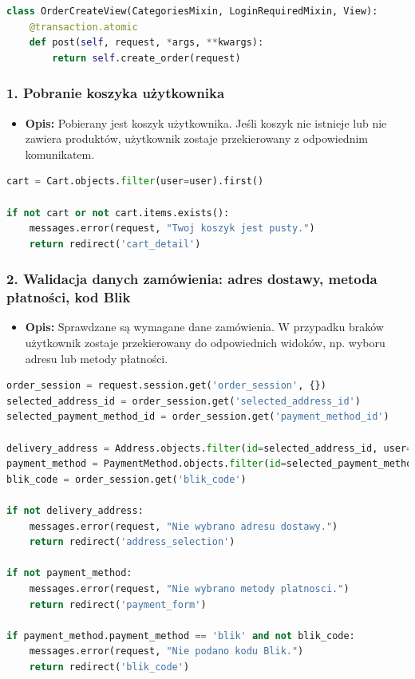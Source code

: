 \documentclass[12pt,a4paper,oneside]{article}
\theoremstyle{definition}
\numberwithin{equation}{section}
\begin{document}
\begin{lstlisting}[language=Python, caption=Metoda post()]
class OrderCreateView(CategoriesMixin, LoginRequiredMixin, View):
    @transaction.atomic
    def post(self, request, *args, **kwargs):
        return self.create_order(request)
\end{lstlisting}



\subsubsection*{1. Pobranie koszyka użytkownika}
\begin{itemize}
    \item \textbf{Opis:} Pobierany jest koszyk użytkownika. Jeśli koszyk nie istnieje lub nie zawiera produktów, użytkownik zostaje przekierowany z odpowiednim komunikatem.
\end{itemize}

\begin{lstlisting}[language=Python]
cart = Cart.objects.filter(user=user).first()

if not cart or not cart.items.exists():
    messages.error(request, "Twoj koszyk jest pusty.")
    return redirect('cart_detail')
\end{lstlisting}



\subsubsection*{2. Walidacja danych zamówienia: adres dostawy, metoda płatności, kod Blik}
\begin{itemize}
    \item \textbf{Opis:} Sprawdzane są wymagane dane zamówienia. W przypadku braków użytkownik zostaje przekierowany do odpowiednich widoków, np. wyboru adresu lub metody płatności.
\end{itemize}

\begin{lstlisting}[language=Python]
order_session = request.session.get('order_session', {})
selected_address_id = order_session.get('selected_address_id')
selected_payment_method_id = order_session.get('payment_method_id')

delivery_address = Address.objects.filter(id=selected_address_id, user=user).first()
payment_method = PaymentMethod.objects.filter(id=selected_payment_method_id, user=user).first()
blik_code = order_session.get('blik_code')

if not delivery_address:
    messages.error(request, "Nie wybrano adresu dostawy.")
    return redirect('address_selection')

if not payment_method:
    messages.error(request, "Nie wybrano metody platnosci.")
    return redirect('payment_form')

if payment_method.payment_method == 'blik' and not blik_code:
    messages.error(request, "Nie podano kodu Blik.")
    return redirect('blik_code')
\end{lstlisting}
\end{document}
